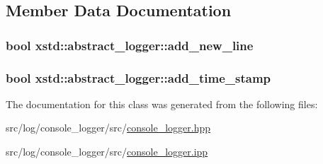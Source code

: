 \subsection{Member Data Documentation}
\hypertarget{classxstd_1_1abstract__logger_a5216ec0a18fea2571db19d5a55d8700f}{
\subsubsection[{add\-\_\-new\-\_\-line}]{\setlength{\rightskip}{0pt plus 5cm}bool xstd\-::abstract\-\_\-logger\-::add\-\_\-new\-\_\-line\hspace{0.3cm}{\ttfamily [inherited]}}}\label{classxstd_1_1abstract__logger_a5216ec0a18fea2571db19d5a55d8700f}
\hypertarget{classxstd_1_1abstract__logger_a534b4f6a3dcdd3b7f18abfcb1bb5b937}{
\subsubsection[{add\-\_\-time\-\_\-stamp}]{\setlength{\rightskip}{0pt plus 5cm}bool xstd\-::abstract\-\_\-logger\-::add\-\_\-time\-\_\-stamp\hspace{0.3cm}{\ttfamily [inherited]}}}\label{classxstd_1_1abstract__logger_a534b4f6a3dcdd3b7f18abfcb1bb5b937}


The documentation for this class was generated from the following files\-:\begin{DoxyCompactItemize}
\item 
src/log/console\-\_\-logger/src/\hyperlink{console__logger_8hpp}{console\-\_\-logger.\-hpp}\item 
src/log/console\-\_\-logger/src/\hyperlink{console__logger_8ipp}{console\-\_\-logger.\-ipp}\end{DoxyCompactItemize}
